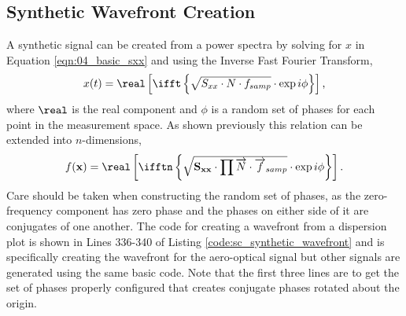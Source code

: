 \subsection{Synthetic Wavefront Creation}
A synthetic signal can be created from a power spectra by solving for $x$ in Equation \ref{eqn:04_basic_sxx} and using the Inverse Fast Fourier Transform,
\begin{equation}
  x(t) = \real\left[\ifft\left\{\sqrt{S_{xx}\cdot N\cdot f_{samp}}\cdot\exp{i\phi}\right\}\right] \textrm{,}
  \label{eqn:04_ifft}
\end{equation}
where $\real$ is the real component and $\phi$ is a random set of phases for each point in the measurement space.
As shown previously this relation can be extended into $n$-dimensions,
\begin{equation}
  f(\mathbf{x}) = \real\left[\ifftn\left\{\sqrt{\mathbf{S_{xx}}\cdot\prod{\overrightarrow{N}\cdot \overrightarrow{f}_{samp}}}\cdot\exp{i\mathbf{\phi}}\right\}\right] \textrm{.}
  \label{eqn:04_ifftn}
\end{equation}
Care should be taken when constructing the random set of phases, as the zero-frequency component has zero phase and the phases on either side of it are conjugates of one another.
The code for creating a wavefront from a dispersion plot is shown in Lines 336-340 of Listing \ref{code:sc_synthetic_wavefront} and is specifically creating the wavefront for the aero-optical signal but other signals are generated using the same basic code.
Note that the first three lines are to get the set of phases properly configured that creates conjugate phases rotated about the origin.
% 

